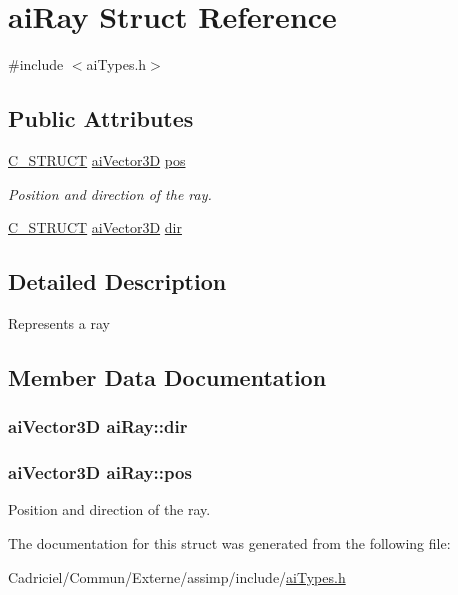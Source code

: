 \hypertarget{structai_ray}{\section{ai\-Ray Struct Reference}
\label{structai_ray}
}


{\ttfamily \#include $<$ai\-Types.\-h$>$}

\subsection*{Public Attributes}
\begin{DoxyCompactItemize}
\item 
\hyperlink{ai_defines_8h_ab51df4230ceb602bbc1bc109c432a6a0}{C\-\_\-\-S\-T\-R\-U\-C\-T} \hyperlink{structai_vector3_d}{ai\-Vector3\-D} \hyperlink{structai_ray_a312f663a7d2580b1b3beb52ffd4ab4c9}{pos}
\begin{DoxyCompactList}\small\item\em Position and direction of the ray. \end{DoxyCompactList}\item 
\hyperlink{ai_defines_8h_ab51df4230ceb602bbc1bc109c432a6a0}{C\-\_\-\-S\-T\-R\-U\-C\-T} \hyperlink{structai_vector3_d}{ai\-Vector3\-D} \hyperlink{structai_ray_a635d9120af2654716e5e7952d837282b}{dir}
\end{DoxyCompactItemize}


\subsection{Detailed Description}
Represents a ray 

\subsection{Member Data Documentation}
\hypertarget{structai_ray_a635d9120af2654716e5e7952d837282b}{
\subsubsection[{dir}]{ {\bf ai\-Vector3\-D} ai\-Ray\-::dir}}\label{structai_ray_a635d9120af2654716e5e7952d837282b}
\hypertarget{structai_ray_a312f663a7d2580b1b3beb52ffd4ab4c9}{
\subsubsection[{pos}]{ {\bf ai\-Vector3\-D} ai\-Ray\-::pos}}\label{structai_ray_a312f663a7d2580b1b3beb52ffd4ab4c9}


Position and direction of the ray. 



The documentation for this struct was generated from the following file\-:\begin{DoxyCompactItemize}
\item 
Cadriciel/\-Commun/\-Externe/assimp/include/\hyperlink{ai_types_8h}{ai\-Types.\-h}\end{DoxyCompactItemize}
